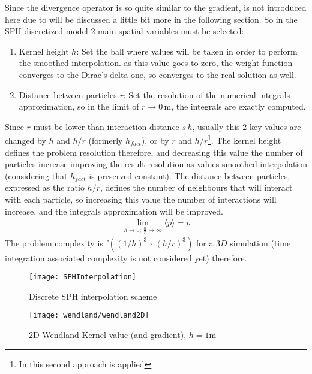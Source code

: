 %
Since the divergence operator is so quite similar to the gradient, is not introduced here due to will
be discussed a little bit more in the following section.\rc
%
So in the SPH discretized model 2 main spatial variables must be selected:
%
\begin{enumerate}
	\item Kernel height $h$: Set the ball where values will be taken in order to perform the smoothed
	interpolation. as this value goes to zero, the weight function converges to the Dirac's delta one,
	so converges to the real solution as well.
	\item Distance between particles $r$: Set the resolution of the numerical integrals approximation,
	so in the limit of $r \rightarrow 0 \, \mbox{m}$, the integrals are exactly computed.
\end{enumerate}
%
Since $r$ must be lower than interaction distance $s \, h$, usually this 2 key values are changed by $h$
and $h / r$ (formerly $h_{fact}$), or by $r$ and $h / r$\footnote{In \NAME this second approach is applied}.
The kernel height defines the problem resolution therefore, and decreasing this value the number of particles
increase improving the result resolution as values smoothed interpolation (considering that $h_{fact}$ is
preserved constant). The distance between particles, expressed as the ratio $h / r$, defines the number
of neighbours that will interact with each particle, so increasing this value the number of interactions
will increase, and the integrals approximation will be improved.
%
\begin{eqnarray}
\lim_{h \to 0; \, \frac{h}{r} \to \infty} \langle p \rangle = p
\end{eqnarray}
%
The problem complexity is $\mathrm{f} \left((1/h)^3 \,\cdot\, (h/r)^3\right)$ for a $3D$ simulation (time
integration associated complexity is not considered yet) therefore.
%
\begin{figure}[!ht]
  \centering
  \texttt{[image: SPHInterpolation]}
  \caption{Discrete SPH interpolation scheme}
  \label{fig:sph:interpolationscheme}
\end{figure}
%
\begin{figure}[!ht]
  \centering
  \texttt{[image: wendland/wendland2D]}
  \caption{2D Wendland Kernel value (and gradient), $h=1 \mbox{m}$}
  \label{fig:sph:wendland}
\end{figure}
%

